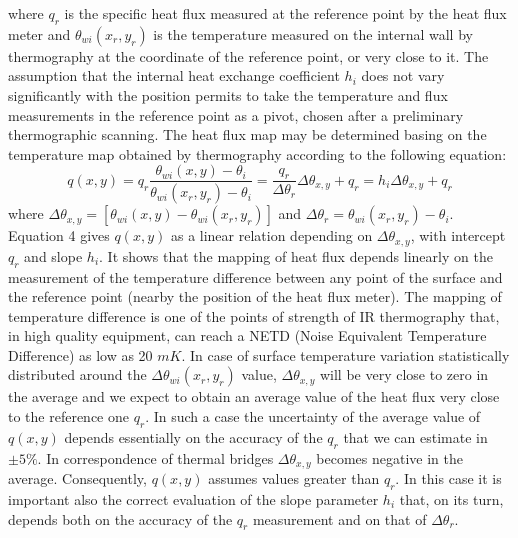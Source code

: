 \documentclass{tQRT2e}
\begin{document}
where $ q_r $ is the specific heat flux measured at the reference point by the heat flux meter and $ \theta_{wi}(x_r,y_r) $ is the temperature measured on the internal wall by thermography at the coordinate of the reference point, or very close to it. The assumption that the internal heat exchange coefficient $ h_i $ does not vary significantly with the position permits to take the temperature and flux measurements in the reference point as a pivot, chosen after a preliminary thermographic scanning. The heat flux map may be determined basing on the temperature map obtained by thermography according to the following equation:
\begin{equation}
q(x,y)=q_r\frac{\theta_{wi} (x,y)-\theta_i}{\theta_{wi} (x_r,y_r)-\theta_i}=\frac{q_r}{\Delta \theta_r}\Delta \theta_{x,y}+q_r=h_i \Delta \theta_{x,y}+q_r
\end{equation}
where $\Delta \theta_{x,y}=[\theta_{wi} (x,y)- \theta_{wi} (x_r,y_r)] $ and $ \Delta \theta_r =\theta_{wi}(x_r,y_r)- \theta_i $.\\
Equation 4 gives $ q(x,y) $ as a linear relation depending on  $ \Delta \theta_{x,y} $, with intercept $ q_r $ and slope $ h_i $. It shows that the mapping of heat flux depends linearly on the measurement of the temperature difference between any point of the surface and the reference point (nearby the position of the heat flux meter). The mapping of temperature difference is one of the points of strength of IR thermography that, in high quality equipment, can reach a NETD (Noise Equivalent Temperature Difference) as low as 20 $ mK $. In case of surface temperature variation statistically distributed around the $ \Delta \theta_{wi}(x_r,y_r) $ value, $ \Delta \theta_{x,y} $ will be very close to zero in the average and we expect to obtain an average value of the heat flux very close to the reference one $ q_r $. In such a case the uncertainty of the average value of $ q(x,y) $ depends essentially on the accuracy of the $ q_r $ that we can estimate in $ ± 5\% $. In correspondence of thermal bridges $ \Delta \theta_{x,y}$ becomes negative in the average. Consequently, $ q(x,y) $  assumes values greater than $ q_r $. In this case it is important also the correct evaluation of the slope parameter $ h_i $ that, on its turn, depends both on the accuracy of the $ q_r $ measurement and on that of $ \Delta \theta_{r} $.
\end{document}
